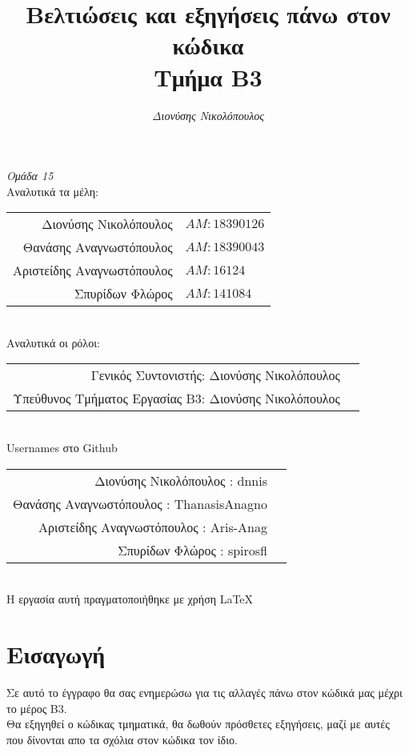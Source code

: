 \documentclass[14pt]{extarticle}
\title{\bf Βελτιώσεις και εξηγήσεις πάνω στον κώδικα \\ Τμήμα B3}
\author{
  \emph{Διονύσης Νικολόπουλος}
}
\begin{document}
\maketitle
\clearpage
  \begin{center}
    \large \emph{Ομάδα 15}
    \\
    Αναλυτικά τα μέλη:
\vspace{5mm}
  \begin{tabular}{r l}
    \\Διονύσης Νικολόπουλος & $AM: 18390126$
    \\Θανάσης Αναγνωστόπουλος & $AM: 18390043$
    \\Αριστείδης Αναγνωστόπουλος & $AM: 16124$
    \\Σπυρίδων Φλώρος & $AM: 141084$
  \end{tabular}
\vspace{5mm}
    \\
    Αναλυτικά οι ρόλοι:
    \\
\vspace{5mm}
  \begin{tabular}{r l}
    \small Γενικός Συντονιστής:   Διονύσης Νικολόπουλος
    \\
    \small Υπεύθυνος Τμήματος Εργασίας B3: Διονύσης Νικολόπουλος
  \end{tabular}
\vspace{5mm}
\\
  \textlatin{Usernames} στο \textlatin{Github}
\\
  \vspace{5mm}
  \begin{tabular}{r l}
    \small Διονύσης Νικολόπουλος : \textlatin{dnnis}
    \\
    \small Θανάσης Αναγνωστόπουλος : \textlatin{ThanasisAnagno}
    \\
    \small Αριστείδης Αναγνωστόπουλος : \textlatin{Aris-Anag}
    \\
    \small Σπυρίδων Φλώρος : \textlatin{spirosfl}
  \end{tabular}
  \\
\vspace*{\fill}
    \footnotesize{Η εργασία αυτή πραγματοποιήθηκε με χρήση \LaTeX}
  \end{center}
\clearpage
\section{Εισαγωγή}
Σε αυτό το έγγραφο θα σας ενημερώσω για τις αλλαγές πάνω στον κώδικά μας μέχρι
το μέρος Β3.
\\
Θα εξηγηθεί ο κώδικας τμηματικά, θα δωθούν πρόσθετες εξηγήσεις, μαζί με αυτές που
δίνονται απο τα σχόλια στον κώδικα τον ίδιο.
\\
\end{document}
